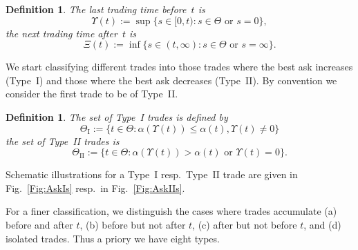 \documentclass[11pt]{scrartcl}
\newtheorem{definition}[theorem]{Definition}
\newcommand{\lasttrade}{\Upsilon}
\begin{document}
\begin{definition}\label{d:first and last trading time}
The \emph{last trading time} before~$t$ is 
\begin{equation}
\Upsilon(t):=\sup\{s\in[0,t):\mbox{$s\in\Theta$ or $s=0$}\},
\end{equation}
the \emph{next trading time} after~$t$ is 
\begin{equation}
\Xi(t) := \inf\{s\in(t,\infty):\mbox{$s\in\Theta$ or $s=\infty$}\}.
\end{equation}
\end{definition}

We start classifying different trades into those trades where the best ask
increases (Type~{I}) and those where the best ask decreases (Type~{II}). By
convention we consider the first trade to be of Type~{II}.

\begin{definition}
The set of \emph{Type~{I} trades} is defined by 
\begin{equation}
\Theta _{\mathrm{I}}:=\{t\in \Theta :\alpha (\Upsilon (t))\leq \alpha
(t),\Upsilon (t)\neq 0\}
\end{equation}%
the set of \emph{Type~{II} trades} is 
\begin{equation*}
\Theta _{\mathrm{II}}:=\{t\in \Theta :%
\mbox{$\alpha(\lasttrade(t)) >
\alpha(t)$ or $\lasttrade(t)=0$}\}.
\end{equation*}
\end{definition}

Schematic illustrations for a Type~{I} resp.\ Type~{II} trade are given in
Fig.~\ref{Fig:AskIs} resp.\ in Fig.~\ref{Fig:AskIIs}.

For a finer classification, we distinguish the cases where trades accumulate
(a) before and after $t$, (b) before but not after $t$, (c) after but not
before $t$, and (d) isolated trades. Thus a priory we have eight types.
\end{document}

